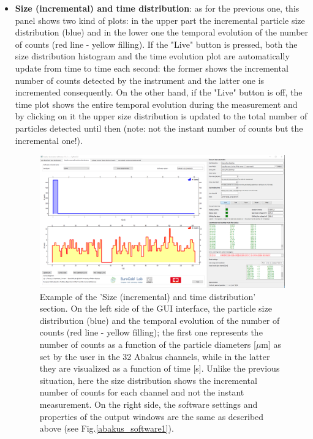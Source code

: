 \documentclass[a4paper, 11pt]{report}
\begin{document}
\begin{itemize}
\item \textbf{Size (incremental) and time distribution}: as for the previous one, this panel shows two kind of plots: in the upper part the incremental particle size distribution (blue) and in the lower one the temporal evolution of the number of counts (red line - yellow filling).
If the "Live" button is pressed, both the size distribution histogram and the time evolution plot are automatically update from time to time each second: the former shows the incremental number of counts detected by the instrument and the latter one is incremented consequently.
On the other hand, if the "Live" button is off, the time plot shows the entire temporal evolution during the measurement and by clicking on it the upper size distribution is updated to the total number of particles detected until then (note: not the instant number of counts but the incremental one!). \\
\begin{figure}[!hp]
	\centering
	\includegraphics[scale=0.3]{incremental_measure.png}
	\caption{Example of the 'Size (incremental) and time distribution' section. On the left side of the GUI interface, the particle size distribution (blue) and the temporal evolution of the number of counts (red line - yellow filling); the first one represents the number of counts as a function of the particle diameters [$\mu$m] as set by the user in the 32 Abakus channels, while in the latter they are visualized as a function of time [s]. Unlike the previous situation, here the size distribution shows the incremental number of counts for each channel and not the instant measurement. On the right side, the software settings and properties of the output windows are the same as described above (see Fig.\ref{abakus_software1}).}
	\label{abakus_software2}
\end{figure}


\end{itemize}
\end{document}
